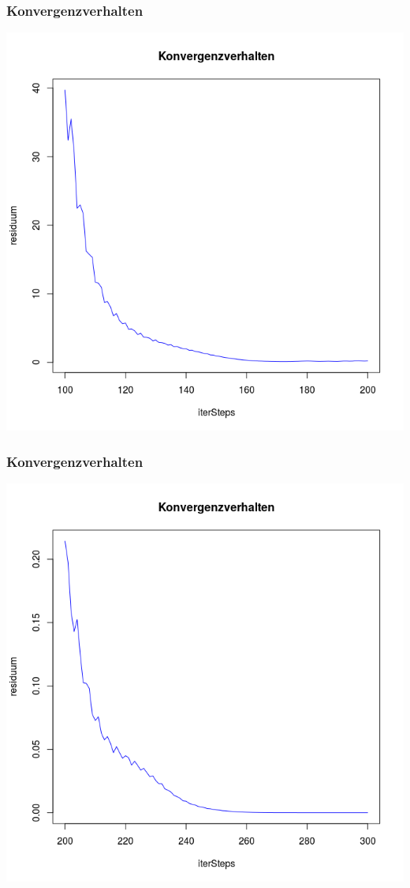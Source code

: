 \documentclass[]{beamer}
\begin{document}
\begin{frame}
\frametitle{Konvergenzverhalten} 
\begin{center}
\includegraphics[scale=0.33]{Konvergenzverhalten_100_200.png}
\end{center}
\end{frame}

\begin{frame}
\frametitle{Konvergenzverhalten} 
\begin{center}
\includegraphics[scale=0.33]{Konvergenzverhalten_200_300.png}
\end{center}
\end{frame}
\end{document}
